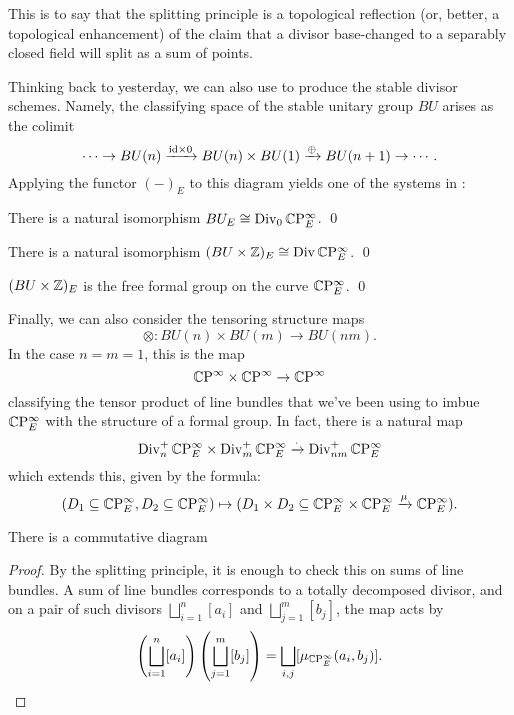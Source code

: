 \noindent This is to say that the splitting principle is a topological reflection (or, better, a topological enhancement) of the claim that a divisor base-changed to a separably closed field will split as a sum of points.

Thinking back to yesterday, we can also use  to produce the stable divisor schemes.  Namely, the classifying space of the stable unitary group $BU$ arises as the colimit \[\cdots \to BU(n) \xrightarrow{\mathrm{id} \times 0} BU(n) \times BU(1) \xrightarrow{\oplus} BU(n+1) \to \cdots.\]  Applying the functor $(-)_E$ to this diagram yields one of the systems in :

\begin{theorem}
There is a natural isomorphism $BU_E \cong \operatorname{Div}_0 \mathbb{C}\mathrm P^\infty_E$. \qed
\end{theorem}

\begin{corollary}
There is a natural isomorphism $(BU \times \mathbb Z)_E \cong \operatorname{Div} \mathbb{C}\mathrm P^\infty_E$. \qed
\end{corollary}

\begin{corollary}
$(BU \times \mathbb Z)_E$ is the free formal group on the curve $\mathbb{C}\mathrm P^\infty_E$. \qed
\end{corollary}

Finally, we can also consider the tensoring structure maps \[\otimes: BU(n) \times BU(m) \to BU(nm).\]  In the case $n = m = 1$, this is the map \[\mathbb{C}\mathrm P^\infty \times \mathbb{C}\mathrm P^\infty \to \mathbb{C}\mathrm P^\infty\] classifying the tensor product of line bundles that we've been using to imbue $\mathbb{C}\mathrm P^\infty_E$ with the structure of a formal group.  In fact, there is a natural map \[\operatorname{Div}_n^+ \mathbb{C}\mathrm P^\infty_E \times \operatorname{Div}_m^+ \mathbb{C}\mathrm P^\infty_E \xrightarrow{\cdot} \operatorname{Div}_{nm}^+ \mathbb{C}\mathrm P^\infty_E\] which extends this, given by the formula: \[(D_1 \subseteq \mathbb{C}\mathrm P^\infty_E, D_2 \subseteq \mathbb{C}\mathrm P^\infty_E) \mapsto (D_1 \times D_2 \subseteq \mathbb{C}\mathrm P^\infty_E \times \mathbb{C}\mathrm P^\infty_E \xrightarrow{\mu} \mathbb{C}\mathrm P^\infty_E).\]
\begin{lemma}
There is a commutative diagram
\begin{center}
\end{center}
\end{lemma}
\begin{proof}
By the splitting principle, it is enough to check this on sums of line bundles.  A sum of line bundles corresponds to a totally decomposed divisor, and on a pair of such divisors $\bigsqcup_{i=1}^n [a_i]$ and $\bigsqcup_{j=1}^m [b_j]$, the map acts by \[\left(\bigsqcup_{i=1}^n [a_i] \right) \left( \bigsqcup_{j=1}^m [b_j] \right) = \bigsqcup_{i, j} [\mu_{\mathbb{C}\mathrm P^\infty_E}(a_i, b_j)]. \qedhere\]
\end{proof}

